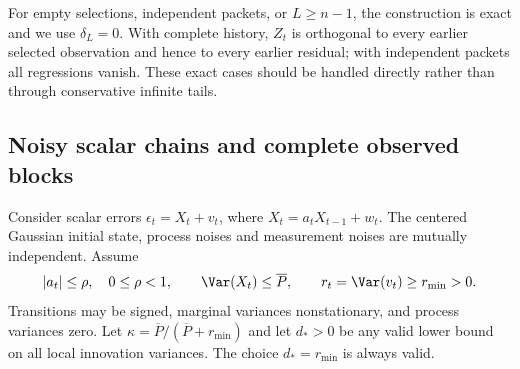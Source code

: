 For empty selections, independent packets, or $L\ge n-1$, the construction
is exact and we use $\delta_L=0$. With complete history, $Z_t$ is orthogonal
to every earlier selected observation and hence to every earlier residual;
with independent packets all regressions vanish. These exact cases should
be handled directly rather than through conservative infinite tails.

\subsection{Noisy scalar chains and complete observed blocks}
\label{subsec:noisy-markov}
Consider scalar errors $\epsilon_t=X_t+v_t$, where
$X_t=a_tX_{t-1}+w_t$. The centered Gaussian initial state, process noises
and measurement noises are mutually independent. Assume
\begin{equation}
 |a_t|\le\rho,\quad 0\le\rho<1,\qquad \Var(X_t)\le\overline P,
 \qquad r_t=\Var(v_t)\ge r_{\min}>0.
 \label{eq:scalar-promises}
\end{equation}
Transitions may be signed, marginal variances nonstationary, and process
variances zero. Let $\kappa=\overline P/(\overline P+r_{\min})$ and let
$d_*>0$ be any valid lower bound on all local innovation variances.
The choice $d_*=r_{\min}$ is always valid.

